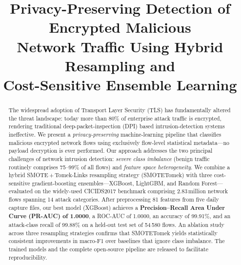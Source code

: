 \documentclass[conference]{IEEEtran}
\begin{document}
\title{Privacy-Preserving Detection of Encrypted Malicious\\
Network Traffic Using Hybrid Resampling and\\
Cost-Sensitive Ensemble Learning}

\author{
  \and
  \and
}

\maketitle

\begin{abstract}
The widespread adoption of Transport Layer Security (TLS) has fundamentally
altered the threat landscape: today more than 80\% of enterprise attack
traffic is encrypted, rendering traditional deep-packet-inspection (DPI)
based intrusion-detection systems ineffective.  We present a
\textit{privacy-preserving} machine-learning pipeline that classifies
malicious encrypted network flows using exclusively flow-level
statistical metadata—no payload decryption is ever performed.  Our
approach addresses the two principal challenges of network intrusion
detection: \textit{severe class imbalance} (benign traffic routinely
comprises 75--99\% of all flows) and \textit{feature space
heterogeneity}.  We combine a hybrid SMOTE\,+\,Tomek-Links resampling
strategy (SMOTETomek) with three cost-sensitive gradient-boosting
ensembles—XGBoost, LightGBM, and Random Forest—evaluated on the
widely-used CICIDS2017 benchmark comprising 2.83\,million network
flows spanning 14 attack categories.  After preprocessing 81 features
from five daily capture files, our best model (XGBoost) achieves a
\textbf{Precision–Recall Area Under Curve (PR-AUC) of 1.0000}, a
ROC-AUC of 1.0000, an accuracy of 99.91\%, and an attack-class recall of
99.88\% on a held-out test set of 54\,580 flows.  An ablation study
across three resampling strategies confirms that SMOTETomek yields
statistically consistent improvements in macro-F1 over baselines that
ignore class imbalance.  The trained models and the complete
open-source pipeline are released to facilitate reproducibility.
\end{abstract}
\end{document}

